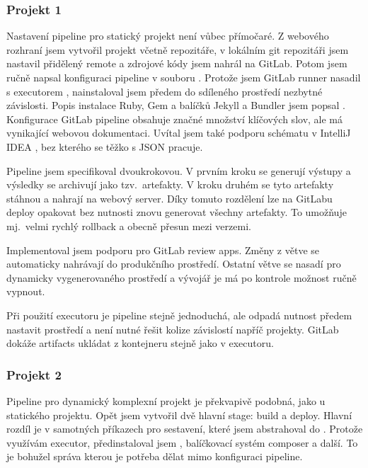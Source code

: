         \subsubsection{Projekt 1}
            Nastavení pipeline pro statický projekt není vůbec přímočaré. Z webového rozhraní jsem vytvořil projekt včetně repozitáře, v lokálním git repozitáři jsem nastavil přidělený remote a zdrojové kódy jsem nahrál na GitLab. Potom jsem ručně napsal konfiguraci pipeline v souboru . Protože jsem GitLab runner nasadil s executorem , nainstaloval jsem předem do sdíleného prostředí nezbytné závislosti. Popis instalace Ruby, Gem a balíčků Jekyll a Bundler jsem popsal . Konfigurace GitLab pipeline obsahuje značné množství klíčových slov, ale má vynikající webovou dokumentaci. Uvítal jsem také podporu schématu v  IntelliJ IDEA \cite{idea-gitlab-plugin}, bez kterého se těžko s JSON pracuje.

            Pipeline jsem specifikoval dvoukrokovou. V prvním kroku se generují výstupy a výsledky se archivují jako tzv.~artefakty. V kroku druhém  se tyto artefakty stáhnou a nahrají na webový server. Díky tomuto rozdělení lze na GitLabu deploy opakovat bez nutnosti znovu generovat všechny artefakty. To umožňuje mj.~velmi rychlý rollback a obecně přesun mezi verzemi.

            Implementoval jsem podporu pro GitLab review apps. Změny z větve  se automaticky nahrávají do produkčního prostředí. Ostatní větve se nasadí pro dynamicky vygenerovaného prostředí a vývojář je má po kontrole možnost ručně vypnout.

            Při použití  executoru je pipeline stejně jednoduchá, ale odpadá nutnost předem nastavit prostředí a není nutné řešit kolize závislostí napříč projekty. GitLab dokáže artifacts ukládat z kontejneru stejně jako v  executoru.

        \subsubsection{Projekt 2}
            Pipeline pro dynamický komplexní projekt je překvapivě podobná, jako u statického projektu. Opět jsem vytvořil dvě hlavní stage: build a deploy. Hlavní rozdíl je v samotných příkazech pro sestavení, které jsem abstrahoval do . Protože využívám  executor, předinstaloval jsem , balíčkovací systém composer a další. To je bohužel správa kterou je potřeba dělat mimo konfiguraci pipeline.

